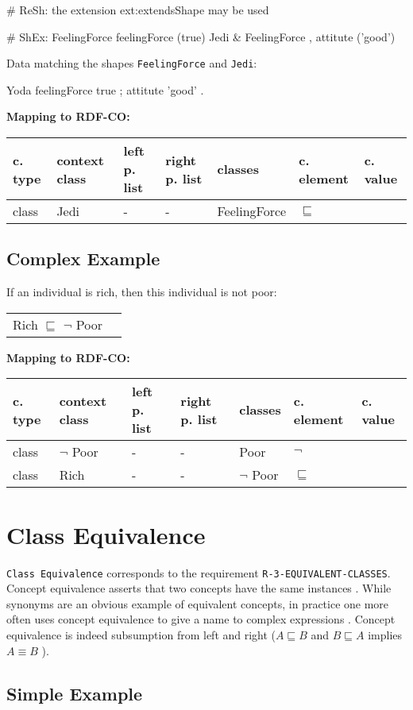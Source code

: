 \documentclass{llncs}
\newcommand{\ms}[1]{\texttt{#1}}
\newenvironment{gcotable}{
  \scriptsize
  \sffamily
  \vspace{0cm}
	\begin{center}
	\textbf{\vspace{0.4cm}Mapping to RDF-CO:} \\
  \begin{tabular}{l|l|l|l|l|l|l}
	\hline
  \textbf{c. type} & \textbf{context class} & \textbf{left p. list} & \textbf{right p. list} & \textbf{classes} & \textbf{c. element} & \textbf{c. value} \\
  \hline

}{
  \hline
  \end{tabular}
	\end{center}
}
\newenvironment{DL}{
  \vspace{0cm}
	\begin{center}
  \begin{tabular}{r l}

}{
  \end{tabular}
	\end{center}
}
\begin{document}
\begin{ex}
# ReSh:
the extension ext:extendsShape may be used
\end{ex}

\begin{ex}
# ShEx:
FeelingForce {
    feelingForce (true) }
Jedi {
    & FeelingForce ,
    attitute ('good') }
\end{ex}

Data matching the shapes \ms{FeelingForce} and \ms{Jedi}:

\begin{ex}
Yoda 
    feelingForce true ;
    attitute 'good' .
\end{ex}

\begin{gcotable}
class & Jedi & - & - & FeelingForce & $\sqsubseteq$ \\
\end{gcotable}

\subsection{Complex Example}

If an individual is rich, then this individual is not poor:

\begin{DL}
Rich $\sqsubseteq$ $\neg$ Poor 
\end{DL}

\begin{gcotable}
class & $\neg$ Poor & - & - & Poor & $\neg$ \\
class & Rich & - & - & $\neg$ Poor & $\sqsubseteq$ \\
\end{gcotable}

\section{Class Equivalence}

\ms{Class Equivalence} corresponds to the requirement \ms{R-3-EQUIVALENT-CLASSES}.
Concept equivalence asserts that two concepts have the same instances \cite{Kroetzsch2012}.
While synonyms are an obvious example of equivalent concepts, in practice one more
often uses concept equivalence to give a name to complex expressions \cite{Kroetzsch2012}.
Concept equivalence is indeed subsumption from left and right ($A \sqsubseteq B$ and $B \sqsubseteq A$ implies $A \equiv B$ ).

\subsection{Simple Example}
\end{document}
